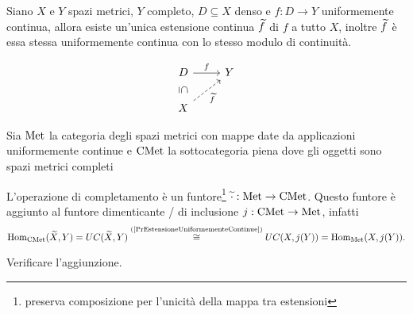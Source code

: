 \begin{proposition}\label{PrEstensioneUniformementeContinue}
Siano $X$ e $Y$ spazi metrici, $Y$ completo, $D\subseteq X$ denso e $f:D\to Y$ uniformemente continua, allora esiste un'unica estensione continua $\widetilde{f}$ di $f$ a tutto $X$, inoltre $\widetilde{f}$ \`e essa stessa uniformemente continua con lo stesso modulo di continuit\`a.

\[\begin{tikzcd}
	D & Y \\
	X
	\arrow["f", from=1-1, to=1-2]
	\arrow["\subseteq"{marking, allow upside down}, draw=none, from=1-1, to=2-1]
	\arrow["{\wt f}"', dashed, from=2-1, to=1-2]
\end{tikzcd}\]
\end{proposition}

\begin{definition}
Sia $\mathrm{Met}$ la categoria degli spazi metrici con mappe date da applicazioni uniformemente continue e $\mathrm{CMet}$ la sottocategoria piena dove gli oggetti sono spazi metrici completi
\end{definition}

\begin{remark}
L'operazione di completamento \`e un funtore\footnote{preserva composizione per l'unicit\`a della mappa tra estensioni} $\widetilde{\cdot}:\mathrm{Met}\to \mathrm{CMet}$. Questo funtore \`e aggiunto al funtore dimenticante / di inclusione $j:\mathrm{CMet}\to \mathrm{Met}$, infatti
\[\operatorname{Hom}_{\mathrm{CMet}}(\widetilde{X},Y)=UC(\widetilde{X},Y)\overset{\text{(\ref{PrEstensioneUniformementeContinue})}}{\cong} UC(X,j(Y))=\operatorname{Hom}_{\mathrm{Met}}(X,j(Y)).\]
\end{remark}

\begin{exercise}
Verificare l'aggiunzione.
\end{exercise}



